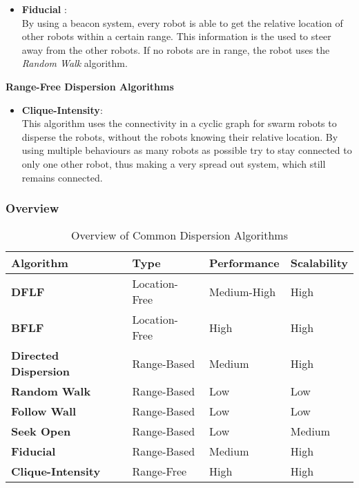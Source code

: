 \begin{itemize}
		\item \textbf{Fiducial} \cite{morlok2007dispersing}:\\
			By using a beacon system, every robot is able to get the relative location of other robots within a certain range. This information is the used to steer away from the other robots. If no robots are in range, the robot uses the \emph{Random Walk} algorithm.
	\end{itemize}
	\textbf{Range-Free Dispersion Algorithms}
	\begin{itemize}
		\item \textbf{Clique-Intensity}\cite{ludwig2006robotic}:\\
			This algorithm uses the connectivity in a cyclic graph for swarm robots to disperse the robots, without the robots knowing their relative location. By using multiple behaviours as many robots as possible try to stay connected to only one other robot, thus making a very spread out system, which still remains connected.
	\end{itemize}

  \subsubsection{Overview}
  \begin{table}[!t]
  \renewcommand{\arraystretch}{1.3}
  \label{table_example}
  \centering
    \begin{tabular}{|l|p{2.2cm}|p{2.2cm}|p{2.2cm}|}
    \hline
    \bfseries Algorithm & \bfseries Type & \bfseries Performance & \bfseries Scalability\\
    \hline
    \bfseries DFLF& Location-Free & Medium-High & High\\\hline
    \bfseries BFLF & Location-Free & High & High\\\hline
    \bfseries Directed Dispersion & Range-Based & Medium & High\\\hline
    \bfseries Random Walk& Range-Based & Low & Low\\\hline
    \bfseries Follow Wall& Range-Based & Low & Low\\\hline
    \bfseries Seek Open& Range-Based & Low & Medium\\\hline
    \bfseries Fiducial& Range-Based & Medium & High\\\hline
    \bfseries Clique-Intensity& Range-Free & High & High\\\hline
    \end{tabular}
  \caption{Overview of Common Dispersion Algorithms}
  \end{table}

